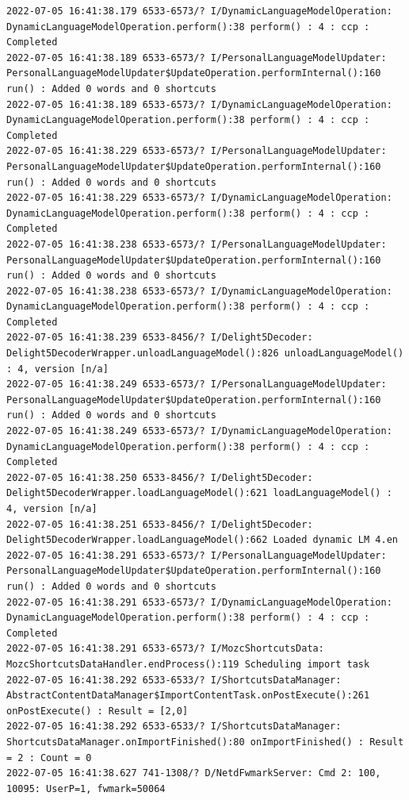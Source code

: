 \documentclass[a4paper,12pt]{book}
\begin{document}
\begin{lstlisting}
2022-07-05 16:41:38.179 6533-6573/? I/DynamicLanguageModelOperation: DynamicLanguageModelOperation.perform():38 perform() : 4 : ccp : Completed
2022-07-05 16:41:38.189 6533-6573/? I/PersonalLanguageModelUpdater: PersonalLanguageModelUpdater$UpdateOperation.performInternal():160 run() : Added 0 words and 0 shortcuts
2022-07-05 16:41:38.189 6533-6573/? I/DynamicLanguageModelOperation: DynamicLanguageModelOperation.perform():38 perform() : 4 : ccp : Completed
2022-07-05 16:41:38.229 6533-6573/? I/PersonalLanguageModelUpdater: PersonalLanguageModelUpdater$UpdateOperation.performInternal():160 run() : Added 0 words and 0 shortcuts
2022-07-05 16:41:38.229 6533-6573/? I/DynamicLanguageModelOperation: DynamicLanguageModelOperation.perform():38 perform() : 4 : ccp : Completed
2022-07-05 16:41:38.238 6533-6573/? I/PersonalLanguageModelUpdater: PersonalLanguageModelUpdater$UpdateOperation.performInternal():160 run() : Added 0 words and 0 shortcuts
2022-07-05 16:41:38.238 6533-6573/? I/DynamicLanguageModelOperation: DynamicLanguageModelOperation.perform():38 perform() : 4 : ccp : Completed
2022-07-05 16:41:38.239 6533-8456/? I/Delight5Decoder: Delight5DecoderWrapper.unloadLanguageModel():826 unloadLanguageModel() : 4, version [n/a]
2022-07-05 16:41:38.249 6533-6573/? I/PersonalLanguageModelUpdater: PersonalLanguageModelUpdater$UpdateOperation.performInternal():160 run() : Added 0 words and 0 shortcuts
2022-07-05 16:41:38.249 6533-6573/? I/DynamicLanguageModelOperation: DynamicLanguageModelOperation.perform():38 perform() : 4 : ccp : Completed
2022-07-05 16:41:38.250 6533-8456/? I/Delight5Decoder: Delight5DecoderWrapper.loadLanguageModel():621 loadLanguageModel() : 4, version [n/a]
2022-07-05 16:41:38.251 6533-8456/? I/Delight5Decoder: Delight5DecoderWrapper.loadLanguageModel():662 Loaded dynamic LM 4.en
2022-07-05 16:41:38.291 6533-6573/? I/PersonalLanguageModelUpdater: PersonalLanguageModelUpdater$UpdateOperation.performInternal():160 run() : Added 0 words and 0 shortcuts
2022-07-05 16:41:38.291 6533-6573/? I/DynamicLanguageModelOperation: DynamicLanguageModelOperation.perform():38 perform() : 4 : ccp : Completed
2022-07-05 16:41:38.291 6533-6573/? I/MozcShortcutsData: MozcShortcutsDataHandler.endProcess():119 Scheduling import task
2022-07-05 16:41:38.292 6533-6533/? I/ShortcutsDataManager: AbstractContentDataManager$ImportContentTask.onPostExecute():261 onPostExecute() : Result = [2,0]
2022-07-05 16:41:38.292 6533-6533/? I/ShortcutsDataManager: ShortcutsDataManager.onImportFinished():80 onImportFinished() : Result = 2 : Count = 0
2022-07-05 16:41:38.627 741-1308/? D/NetdFwmarkServer: Cmd 2: 100, 10095: UserP=1, fwmark=50064

\end{lstlisting}
\end{document}
